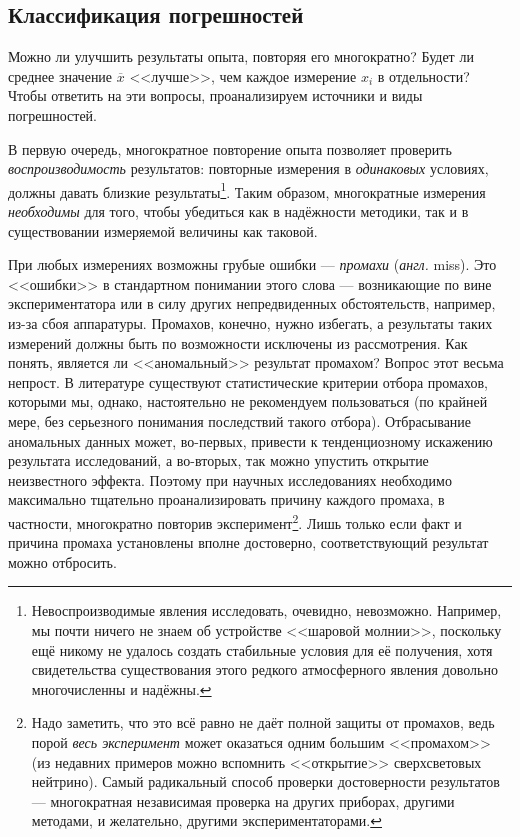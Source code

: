\documentclass[10pt]{article}
\begin{document}
\subsection{Классификация погрешностей}

Можно ли улучшить результаты опыта, повторяя его многократно? Будет
ли среднее значение $\overline{x}$ <<лучше>>,
чем каждое измерение $x_{i}$ в отдельности? Чтобы ответить на эти
вопросы, проанализируем источники и виды погрешностей.

В первую очередь, многократное повторение опыта позволяет проверить
\emph{воспроизводимость} результатов: повторные измерения в \emph{одинаковых}
условиях, должны давать близкие результаты\footnote{Невоспроизводимые явления исследовать, очевидно, невозможно. Например,
мы почти ничего не знаем об устройстве <<шаровой молнии>>,
поскольку ещё никому не удалось создать стабильные условия для её
получения, хотя свидетельства существования этого редкого атмосферного
явления довольно многочисленны и надёжны.}. Таким образом, многократные измерения \emph{необходимы} для того,
чтобы убедиться как в надёжности методики, так и в существовании измеряемой
величины как таковой.

При любых измерениях возможны грубые ошибки --- \emph{промахи}
(\emph{англ.} miss). Это <<ошибки>> в стандартном
понимании этого слова --- возникающие по вине экспериментатора
или в силу других непредвиденных обстоятельств, например, из-за сбоя
аппаратуры. Промахов, конечно, нужно избегать, а результаты таких
измерений должны быть по возможности исключены из рассмотрения. Как
понять, является ли <<аномальный>> результат
промахом? Вопрос этот весьма непрост. В литературе существуют статистические
критерии отбора промахов, которыми мы, однако, настоятельно не рекомендуем
пользоваться (по крайней мере, без серьезного понимания последствий
такого отбора). Отбрасывание аномальных данных может, во-первых, привести
к тенденциозному искажению результата исследований, а во-вторых, так
можно упустить открытие неизвестного эффекта. Поэтому при научных
исследованиях необходимо максимально тщательно проанализировать причину
каждого промаха, в частности, многократно повторив эксперимент\footnote{Надо заметить, что это всё равно не даёт полной защиты от промахов,
ведь порой \emph{весь эксперимент} может оказаться одним большим <<промахом>>
(из недавних примеров можно вспомнить <<открытие>>
сверхсветовых нейтрино). Самый радикальный способ проверки достоверности
результатов --- многократная независимая проверка на других
приборах, другими методами, и желательно, другими экспериментаторами.}. Лишь только если факт и причина промаха установлены вполне достоверно,
соответствующий результат можно отбросить.
\end{document}
